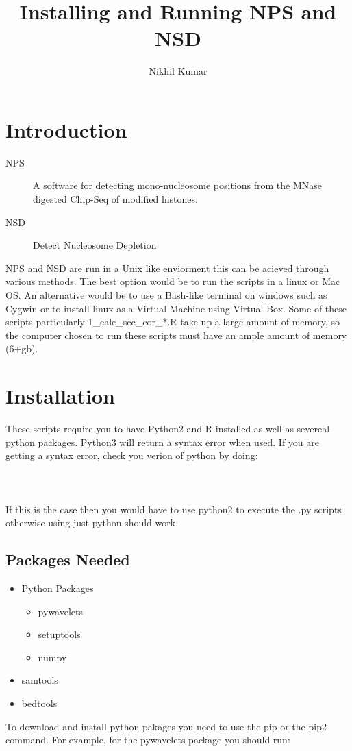 \documentclass[14pt]{article}
\begin{document}
\rfoot[11pt]{\today}
\linespread{1.5}	
\fancyhead{}
\renewcommand{\headrulewidth}{0pt}
\title{Installing and Running NPS and NSD}
\author{Nikhil Kumar}

\date{}
\maketitle

\clearpage

\section{Introduction}
\begin{description}
\item[NPS]A software for detecting mono-nucleosome positions from the MNase digested Chip-Seq of modified histones.
\item[NSD]Detect Nucleosome Depletion
\end{description}
 NPS and NSD are run in a Unix like enviorment this can be acieved through various methods. The best option would be to run the scripts in a linux or  Mac OS. An alternative would be to use a Bash-like terminal on windows such as Cygwin or to install linux as a Virtual Machine using Virtual Box. Some of these scripts particularly 1\_calc\_scc\_cor\_*.R take up a large amount of memory, so the computer chosen to run these scripts must have an ample amount of memory (6+gb). \\
\section{Installation}
These scripts require you to have Python2 and R installed as well as severeal python packages. Python3 will return a syntax error when used. If you are getting a syntax error, check you verion of python by doing:\\
\\
\\
\\
If this is the case then you would have to use python2 to execute the .py scripts otherwise using just python should work. 

\subsection{Packages Needed}
\begin{itemize}
      \item Python Packages
       \begin{itemize} 
         \item pywavelets
         \item setuptools
         \item numpy
        \end{itemize}
\item samtools
\item bedtools
\end{itemize}
To download and install python pakages you need to use the pip or the pip2 command. For example, for the pywavelets package you should run:\\
\end{document}
